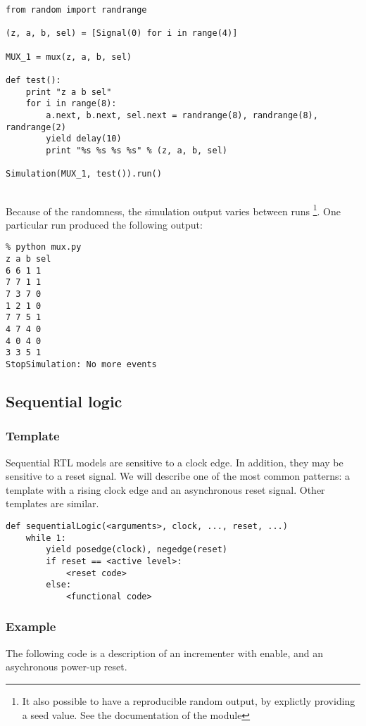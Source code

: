 \begin{verbatim}
from random import randrange

(z, a, b, sel) = [Signal(0) for i in range(4)]

MUX_1 = mux(z, a, b, sel)

def test():
    print "z a b sel"
    for i in range(8):
        a.next, b.next, sel.next = randrange(8), randrange(8), randrange(2)
        yield delay(10)
        print "%s %s %s %s" % (z, a, b, sel)
        
Simulation(MUX_1, test()).run() 
   
\end{verbatim}

Because of the randomness, the simulation output varies between runs
\footnote{It also possible to have a reproducible random output, by
explictly providing a seed value. See the documentation of the
 module}. One particular run produced the following
output:

\begin{verbatim}
% python mux.py
z a b sel
6 6 1 1
7 7 1 1
7 3 7 0
1 2 1 0
7 7 5 1
4 7 4 0
4 0 4 0
3 3 5 1
StopSimulation: No more events
\end{verbatim}


\subsection{Sequential logic}

\subsubsection{Template}
Sequential RTL models are sensitive to a clock edge. In addition, they
may be sensitive to a reset signal. We will describe one of the most
common patterns: a template with a rising clock edge and an
asynchronous reset signal. Other templates are similar.

\begin{verbatim}
def sequentialLogic(<arguments>, clock, ..., reset, ...)
    while 1:
        yield posedge(clock), negedge(reset)
        if reset == <active level>:
            <reset code>
        else:
            <functional code>

\end{verbatim}


\subsubsection{Example}
The following code is a description of an incrementer with enable, and
an asychronous power-up reset.

